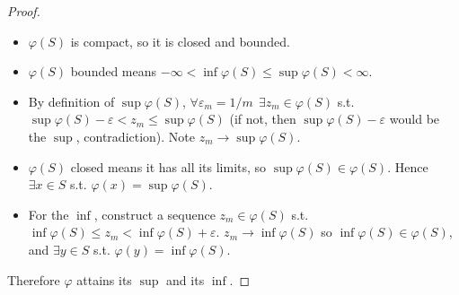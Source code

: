\documentclass{article}
\theoremstyle{mythm}
\theoremstyle{mydef}
\begin{document}
\begin{enumerate}
\begin{proof}
\begin{itemize}
        \item $\varphi(S)$ is compact, so it is closed and bounded.

        \item $\varphi(S)$ bounded means $-\infty < \inf \varphi(S) \le \sup \varphi(S) < \infty$.

        \item By definition of $\sup \varphi(S)$, $\forall \varepsilon_m = 1/m ~~ \exists z_m \in \varphi(S)$ s.t. $\sup \varphi(S) - \varepsilon < z_m \le \sup \varphi(S)$ (if not, then $\sup \varphi(S) - \varepsilon$ would be the $\sup$, contradiction). Note $z_m \to \sup \varphi(S)$.

        \item $\varphi(S)$ closed means it has all its limits, so $\sup \varphi(S) \in \varphi(S)$. Hence $\exists x \in S$ s.t. $\varphi(x) = \sup \varphi(S)$.

        \item For the $\inf$, construct a sequence $z_m \in \varphi(S)$ s.t. $\inf \varphi(S) \le z_m < \inf \varphi(S) + \varepsilon$. $z_m \to \inf \varphi(S)$ so $\inf \varphi(S) \in \varphi(S)$, and $\exists y \in S$ s.t. $\varphi(y) = \inf \varphi(S)$.
      \end{itemize}

      Therefore $\varphi$ attains its $\sup$ and its $\inf$.
    \end{proof}
\end{enumerate}
\end{document}
